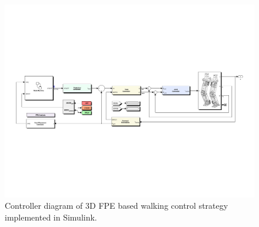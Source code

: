 \begin{figure}[!b]
    \centerline{\includegraphics[trim = 12mm 75mm 12mm 75mm,clip,width=18cm]{fig/simulations/fpecontroller.pdf}}
  	\caption{Controller diagram of 3D FPE based walking control strategy implemented in Simulink.}
	\label{fig:fpecontroller}
\end{figure}

